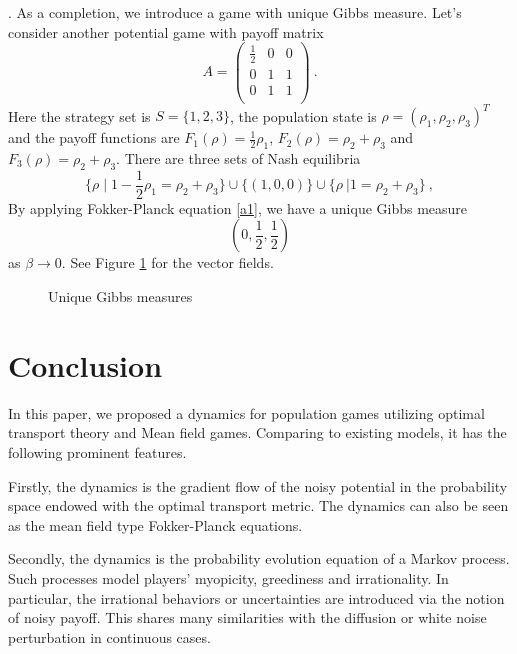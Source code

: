 \documentclass[11pt,reqno]{amsart}
\begin{document}
. 
As a completion, we introduce a game with unique Gibbs measure. 
Let's consider another potential game with payoff matrix
\begin{equation*}
A=\begin{pmatrix}
\frac{1}{2}&0&0\\
0&1&1\\
0&1&1\\
\end{pmatrix}\ .
\end{equation*}
Here the strategy set is $S=\{1, 2, 3\}$, the population state is
$\rho=(\rho_1,\rho_2,\rho_3)^T$ and the payoff functions are $F_1(\rho)=\frac{1}{2}\rho_1$, $F_2(\rho)=\rho_2+\rho_3$ and $F_3(\rho)=\rho_2+\rho_3$.
There are three sets of Nash equilibria 
\begin{equation*}
\{\rho \mid1-\frac{1}{2}\rho_1=\rho_2+\rho_3\}\cup\{(1,0,0)\} \cup \{\rho~|1=\rho_2+\rho_3\}\ ,
\end{equation*}
By applying Fokker-Planck equation \eqref{a1}, we have a unique Gibbs measure
\begin{equation*}
(0,\frac{1}{2},\frac{1}{2})
\end{equation*}
as $\beta\rightarrow 0$. See Figure \ref{unique-gibbs} for the vector fields.
\begin{figure}[H]
 \hspace{0.45cm}
\caption{Unique Gibbs measures}
\label{unique-gibbs}
\end{figure}

\section{Conclusion}
In this paper, we proposed a dynamics for population games utilizing optimal transport theory and Mean field games. Comparing to existing models, it has the following prominent features.

Firstly, the dynamics is the gradient flow of the noisy potential in the probability space endowed with the optimal transport metric. The dynamics can also be seen as the mean field type Fokker-Planck equations.  

Secondly, the dynamics is the probability evolution equation of a Markov process. Such processes model players' myopicity, greediness and irrationality. In particular, the irrational behaviors or uncertainties are introduced via the notion of noisy payoff. This shares many similarities with the diffusion or white noise perturbation in continuous cases. 
\end{document}
